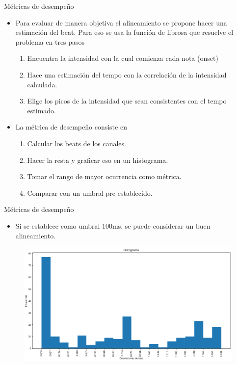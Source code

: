 \documentclass{beamer}
\begin{document}
\begin{frame}{Métricas de desempeño}
\begin{itemize}
    \item Para evaluar de manera objetiva el alineamiento se propone hacer una estimación del beat. Para eso se usa la función de librosa que resuelve el problema en tres pasos
    \begin{enumerate}
        \item Encuentra la intensidad con la cual comienza cada nota (onset) 
        \item Hace una estimación del tempo con la correlación de la intensidad calculada.
        \item Elige los picos de la intensidad que sean consistentes con el tempo estimado.
    \end{enumerate}
    \item La métrica de desempeño consiste en 
    \begin{enumerate}
        \item Calcular los beats de los canales.
        \item Hacer la resta y graficar eso en un histograma.
        \item Tomar el rango de mayor ocurrencia como métrica.
        \item Comparar con un umbral pre-establecido.
    \end{enumerate}
\end{itemize}
    
\end{frame}
\begin{frame}{Métricas de desempeño}
\begin{itemize}
    \item Si se establece como umbral 100ms, se puede considerar un buen alineamiento. 
\end{itemize}
  \begin{figure}
        \centering
        \includegraphics[width=1\textwidth]{histograma.png}
    \end{figure}
    
\end{frame}
\end{document}
